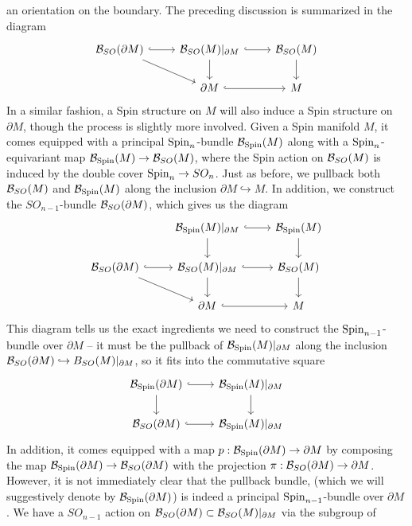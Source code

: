 an orientation on the boundary. The preceding discussion is summarized in
the diagram
\[\begin{tikzcd}
\B_{SO}(\partial M) \ar[r, hookrightarrow] \ar[dr] &
\B_{SO}(M)\vert_{\partial M} \ar[d] \ar[r, hookrightarrow] & \B_{SO}(M) \ar[d] \\
& \partial M \ar[r, hookrightarrow] & M
\end{tikzcd}\]
In a similar fashion, a Spin structure on $M$ will also induce a Spin structure
on $\partial M$, though the process is slightly more involved. Given a Spin
manifold $M$, it comes equipped with a principal $\mathrm{Spin}_n$-bundle $\mathcal{B}_{\mathrm{Spin}}(M)$
along with a $\mathrm{Spin}_n$-equivariant map $\mathcal{B}_{\mathrm{Spin}}(M) \to \mathcal{B}_{SO}(M)$, where
the Spin action on $\mathcal{B}_{SO}(M)$ is induced by the double cover $\mathrm{Spin}_n \to SO_n$.
Just as before, we pullback both $\mathcal{B}_{SO}(M)$ and $\mathcal{B}_{\mathrm{Spin}}(M)$ along
the inclusion $\partial M \hookrightarrow M$. In addition, we construct the
$SO_{n-1}$-bundle $\mathcal{B}_{SO}(\partial M)$, which gives us the diagram
\[\begin{tikzcd}
&\B_{\Spin}(M)\vert_{\partial M} \ar[r, hookrightarrow]\ar[d] & \B_{\Spin}(M) \ar[d] \\
\B_{SO}(\partial M) \ar[r, hookrightarrow] \ar[dr] &\B_{SO}(M)\vert_{\partial M}
\ar[d] \ar[r, hookrightarrow] & \B_{SO}(M) \ar[d] \\
&\partial M \ar[r, hookrightarrow] & M
\end{tikzcd}\]
This diagram tells us the exact ingredients we need to construct the
$\mathrm{Spin}_{n-1}$-bundle over $\partial M$ -- it must be the pullback of
$\mathcal{B}_{\mathrm{Spin}}(M)\vert_{\partial M}$ along the inclusion
$\mathcal{B}_{SO}(\partial M) \hookrightarrow B_{SO}(M)\vert_{\partial M}$, so it fits
into the commutative square
\[\begin{tikzcd}
\B_{\Spin}(\partial M) \ar[d] \ar[r, hookrightarrow] &
\B_{\Spin}(M)\vert_{\partial M}\ar[d] \\
\B_{SO}(\partial M) \ar[r, hookrightarrow] & \B_{\Spin}(M)\vert_{\partial M}
\end{tikzcd}\]
In addition, it comes equipped with a map $p : \mathcal{B}_{\mathrm{Spin}}(\partial M) \to \partial M$
by composing the map $\mathcal{B}_{\mathrm{Spin}}(\partial M) \to \mathcal{B}_{SO}(\partial M)$ with the projection
$\pi : \mathcal{B}_{SO}(\partial M) \to \partial M$. However, it is not immediately clear
that the pullback bundle, (which we will suggestively denote by
$\mathcal{B}_{\mathrm{Spin}}(\partial M)$) is indeed a principal $\mathrm{Spin}_{n-1}$-bundle over
$\partial M$. We have a $SO_{n-1}$ action on
$\mathcal{B}_{SO}(\partial M) \subset \mathcal{B}_{SO}(M)\vert_{\partial M}$ via the subgroup of
